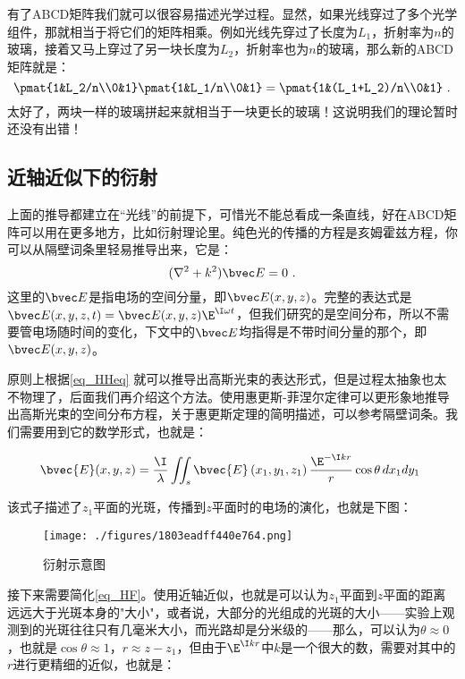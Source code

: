 有了ABCD矩阵我们就可以很容易描述光学过程。显然，如果光线穿过了多个光学组件，那就相当于将它们的矩阵相乘。例如光线先穿过了长度为$L_1$，折射率为$n$的玻璃，接着又马上穿过了另一块长度为$L_2$，折射率也为$n$的玻璃，那么新的ABCD矩阵就是：
\begin{equation}
\pmat{1&L_2/n\\0&1}\pmat{1&L_1/n\\0&1}=\pmat{1&(L_1+L_2)/n\\0&1}~.
\end{equation}
太好了，两块一样的玻璃拼起来就相当于一块更长的玻璃！这说明我们的理论暂时还没有出错！

\subsection{近轴近似下的衍射}
上面的推导都建立在“光线”的前提下，可惜光不能总看成一条直线，好在ABCD矩阵可以用在更多地方，比如衍射理论里。纯色光的传播的方程是亥姆霍兹方程，你可以从隔壁词条里轻易推导出来，它是：
\begin{equation}\label{eq_HHeq}
(\nabla^2+k^2)\bvec E=0~.
\end{equation}
这里的$\bvec E$是指电场的空间分量，即$\bvec E(x,y,z)$。完整的表达式是$\bvec E(x,y,z,t)=\bvec E(x,y,z)\E^{\I \omega t}$，但我们研究的是空间分布，所以不需要管电场随时间的变化，下文中的$\bvec E$均指得是不带时间分量的那个，即$\bvec E(x,y,z)$。

原则上根据\autoref{eq_HHeq} 就可以推导出高斯光束的表达形式，但是过程太抽象也太不物理了，后面我们再介绍这个方法。使用惠更斯-菲涅尔定律可以更形象地推导出高斯光束的空间分布方程，关于惠更斯定理的简明描述，可以参考隔壁词条。我们需要用到它的数学形式，也就是：

\begin{equation}\label{eq_HF}
\bvec{E}(x,y,z)=\frac{\I}{\lambda}\iint_s\bvec{E}\left(x_1,y_1,z_1\right)\frac{\E^{-\I kr}}{r}\cos\theta\, dx_1 dy_1~
\end{equation}

该式子描述了$z_1$平面的光斑，传播到$z$平面时的电场的演化，也就是下图：

\begin{figure}[ht]
\centering
\texttt{[image: ./figures/1803eadff440e764.png]}
\caption{衍射示意图} \label{fig_GBeam_5}
\end{figure}

接下来需要简化\autoref{eq_HF}。使用近轴近似，也就是可以认为$z_1$平面到$z$平面的距离远远大于光斑本身的"大小"，或者说，大部分的光组成的光斑的大小——实验上观测到的光斑往往只有几毫米大小，而光路却是分米级的——那么，可以认为$\theta \approx 0$，也就是$\cos \theta \approx 1$，$r \approx z-z_1$，但由于$\E^{\I kr}$中$k$是一个很大的数，需要对其中的$r$进行更精细的近似，也就是：

